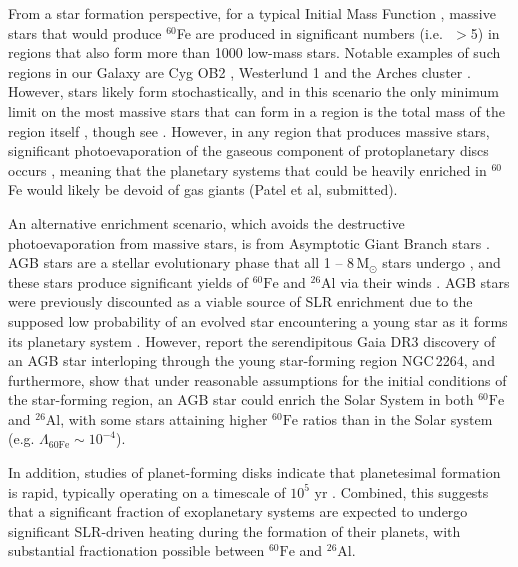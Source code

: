 \documentclass[fleqn,usenatbib]{mnras}
\newcommand{\atom}[2]{$^{#2}\text{#1}$}
\newcommand{\al}{\atom{Al}{26}}
\newcommand{\fe}{\atom{Fe}{60}}
\begin{document}
From a star formation perspective, for a typical Initial Mass Function \citep[e.g.][]{2013MNRAS.429.1725M}, massive stars that would produce $^{60}$Fe are produced in significant numbers (i.e.\,\, $>$5) in regions that also form more than 1000 low-mass stars. Notable examples of such regions in our Galaxy are Cyg OB2 \citep[e.g.][]{2015MNRAS.449..741W}, Westerlund 1 \citep[e.g.][]{2005A&A...434..949C} and the Arches cluster \citep{2002ApJ...581..258F}. However, stars likely form stochastically, and in this scenario the only minimum limit on the most massive stars that can form in a region is the total mass of the region itself \citep{2006ApJ...648..572E}, though see \citet{2006MNRAS.365.1333W}. However, in any region that produces massive stars, significant photoevaporation of the gaseous component of protoplanetary discs occurs \citep[e.g.][]{2001MNRAS.325..449S,2004ApJ...611..360A,2019MNRAS.485.4893N,2019MNRAS.490.5678C,2022EPJP..137.1132W}, meaning that the planetary systems that could be heavily enriched in $^{60}$Fe would likely be devoid of gas giants (Patel et al, submitted). 

An alternative enrichment scenario, which avoids the destructive photoevaporation from massive stars, is from Asymptotic Giant Branch stars \citep[e.g.][]{2016ApJ...825...26K,2018PrPNP.102....1L,parkerIsotopicEnrichmentPlanetary2023}. AGB stars are a stellar evolutionary phase that all 1 -- 8\,M$_\odot$ stars undergo \citep{2005ARA&A..43..435H}, and these stars produce significant yields of \fe{} and \al{} via their winds \citep{2018MNRAS.475.2282V}. AGB stars were previously discounted as a viable source of SLR enrichment due to the supposed low probability of an evolved star encountering a young star as it forms its planetary system \citep{1994ApJ...421..605K}. However, \cite{parkerIsotopicEnrichmentPlanetary2023} report the serendipitous Gaia DR3 discovery of an AGB star interloping through the young star-forming region NGC\,2264, and furthermore, show that under reasonable assumptions for the initial conditions of the star-forming region, an AGB star could enrich the Solar System in both \fe{} and \al{}, with some stars attaining higher \fe{} ratios than in the Solar system (e.g. $\Lambda_{\text{60Fe}} \sim 10^{-4}$).

In addition, studies of planet-forming disks indicate that planetesimal formation is rapid, typically operating on a timescale of $10^5$ yr \citep{Drazkowska2022,2022arXiv220309930M}. Combined, this suggests that a significant fraction of exoplanetary systems are expected to undergo significant SLR-driven heating during the formation of their planets, with substantial fractionation possible between \fe{} and \al{}.
\end{document}
